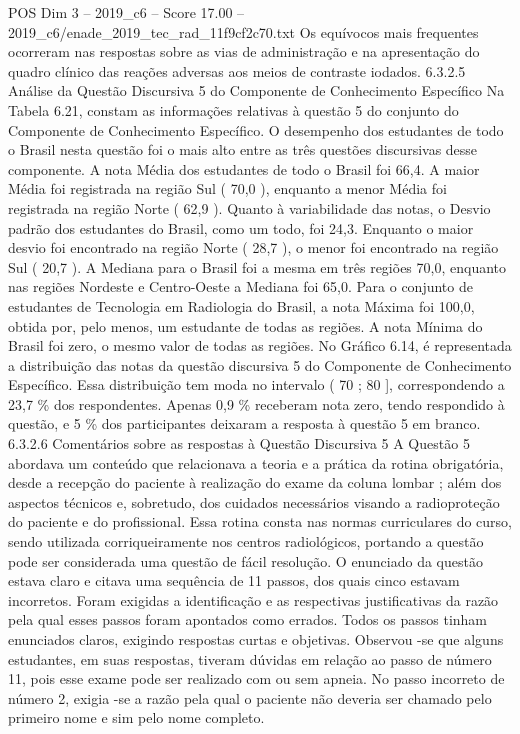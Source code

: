 \begin{textsample}{POS Dim 3 – 2019\_c6 – Score 17.00 – 2019\_c6/enade\_2019\_tec\_rad\_11f9cf2c70.txt}
Os equívocos mais frequentes ocorreram nas respostas sobre as vias de administração e na apresentação do quadro clínico das reações adversas aos meios de contraste iodados. 6.3.2.5 Análise da Questão Discursiva 5 do Componente de Conhecimento Específico Na Tabela 6.21, constam as informações relativas à questão 5 do conjunto do Componente de Conhecimento Específico.
O desempenho dos estudantes de todo o Brasil nesta questão foi o mais alto entre as três questões discursivas desse componente.
A nota Média dos estudantes de todo o Brasil foi 66,4.
A maior Média foi registrada na região Sul ( 70,0 ), enquanto a menor Média foi registrada na região Norte ( 62,9 ).
Quanto à variabilidade das notas, o Desvio padrão dos estudantes do Brasil, como um todo, foi 24,3.
Enquanto o maior desvio foi encontrado na região Norte ( 28,7 ), o menor foi encontrado na região Sul ( 20,7 ).
A Mediana para o Brasil foi a mesma em três regiões 70,0, enquanto nas regiões Nordeste e Centro-Oeste a Mediana foi 65,0.
Para o conjunto de estudantes de Tecnologia em Radiologia do Brasil, a nota Máxima foi 100,0, obtida por, pelo menos, um estudante de todas as regiões.
A nota Mínima do Brasil foi zero, o mesmo valor de todas as regiões.
No Gráfico 6.14, é representada a distribuição das notas da questão discursiva 5 do Componente de Conhecimento Específico.
Essa distribuição tem moda no intervalo ( 70 ; 80 ], correspondendo a 23,7 \% dos respondentes.
Apenas 0,9 \% receberam nota zero, tendo respondido à questão, e 5 \% dos participantes deixaram a resposta à questão 5 em branco. 6.3.2.6 Comentários sobre as respostas à Questão Discursiva 5 A Questão 5 abordava um conteúdo que relacionava a teoria e a prática da rotina obrigatória, desde a recepção do paciente à realização do exame da coluna lombar ; além dos aspectos técnicos e, sobretudo, dos cuidados necessários visando a radioproteção do paciente e do profissional.
Essa rotina consta nas normas curriculares do curso, sendo utilizada corriqueiramente nos centros radiológicos, portando a questão pode ser considerada uma questão de fácil resolução.
O enunciado da questão estava claro e citava uma sequência de 11 passos, dos quais cinco estavam incorretos.
Foram exigidas a identificação e as respectivas justificativas da razão pela qual esses passos foram apontados como errados.
Todos os passos tinham enunciados claros, exigindo respostas curtas e objetivas.
Observou -se que alguns estudantes, em suas respostas, tiveram dúvidas em relação ao passo de número 11, pois esse exame pode ser realizado com ou sem apneia.
No passo incorreto de número 2, exigia -se a razão pela qual o paciente não deveria ser chamado pelo primeiro nome e sim pelo nome completo.

\end{textsample}
